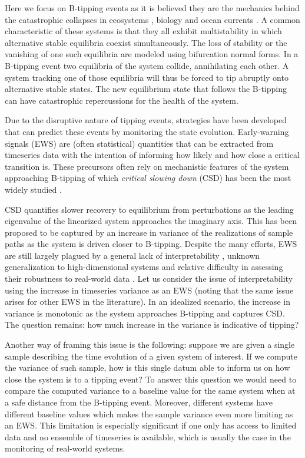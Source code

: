 \documentclass[a4paper,fleqn]{cas-sc}
\begin{document}
Here we focus on B-tipping events as it is believed they are the mechanics behind the catastrophic collapses in ecosystems \cite{May1977}, biology \cite{Donovan2015} and ocean currents \cite{Lohmann2024,vanWesten025a}.
A common characteristic of these systems is that they all exhibit multistability in which alternative stable equilibria coexist simultaneously.
The loss of stability or the vanishing of one such equilibria are modeled using bifurcation normal forms.
In a B-tipping event two equilibria of the system collide, annihilating each other.
A system tracking one of those equilibria will thus be forced to tip abruptly onto alternative stable states.
The new equilibrium state that follows the B-tipping can have catastrophic repercussions for the health of the system.

Due to the disruptive nature of tipping events, strategies have been developed that can predict these events by monitoring the state evolution.
Early-warning signals (EWS) are (often statistical) quantities that can be extracted from timeseries data with the intention of informing how likely and how close a critical transition is.
These precursors often rely on mechanistic features of the system approaching B-tipping of which \textit{critical slowing down} (CSD) has been the most widely studied \cite{VanNes2007, Dakos2008}.

CSD quantifies slower recovery to equilibrium from perturbations as the leading eigenvalue of the linearized system approaches the imaginary axis.
This has been proposed to be captured by an increase in variance of the realizations of sample paths as the system is driven closer to B-tipping.
Despite the many efforts, EWS are still largely plagued by a general lack of interpretability \cite{Ditlevsen2010, Donovan2026}, unknown generalization to high-dimensional systems \cite{Robinson2025} and relative difficulty in assessing their robustness to real-world data \cite{Dakos2012, Ashwin2025}.
Let us consider the issue of interpretability using the increase in timeseries variance as an EWS (noting that the same issue arises for other EWS in the literature).
In an idealized scenario, the increase in variance is monotonic as the system approaches B-tipping and captures CSD. The question remains: how much increase in the variance is indicative of tipping?

Another way of framing this issue is the following: suppose we are given a single sample describing the time evolution of a given system of interest.
If we compute the variance of such sample, how is this single datum able to inform us on how close the system is to a tipping event?
To answer this question we would need to compare the computed variance to a baseline value for the same system when at a safe distance from the B-tipping event.
Moreover, different systems have different baseline values which makes the sample variance even more limiting as an EWS.
This limitation is especially significant if one only has access to limited data and no ensemble of timeseries is available, which is usually the case in the monitoring of real-world systems.
\end{document}
